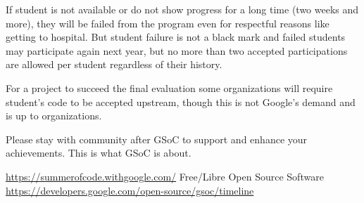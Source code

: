 \documentclass[10pt, a5paper]{article}
\begin{document}
If student is not available or do not show progress for a long time (two weeks and more), they will be failed from the program even for respectful reasons like getting to hospital. But student failure is not a black mark and failed students may participate again next year, but no more than two accepted participations are allowed per student regardless of their history. 

For a project to succeed the final evaluation some organizations will require student's code to be accepted upstream, though this is not Google's demand and is up to organizations.

Please stay with community after GSoC to support and enhance your achievements. This is what GSoC is about.

\begin{thebibliography}{20}
 \url{https://summerofcode.withgoogle.com/}
 Free/Libre Open Source Software
 \url{https://developers.google.com/open-source/gsoc/timeline}
\end{thebibliography}
\end{document}
